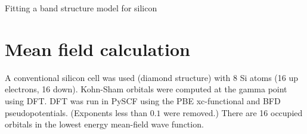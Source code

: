 



\begin{center}
{\Large Fitting a band structure model for silicon}
\end{center}

\section{Mean field calculation}

A conventional silicon cell was used (diamond structure) with 8 Si atoms (16 up electrons, 16 down).
Kohn-Sham orbitals were computed at the gamma point using DFT.
DFT was run in PySCF using the PBE xc-functional and BFD pseudopotentials.
(Exponents less than $0.1$ were removed.)
There are 16 occupied orbitals in the lowest energy mean-field wave function.


